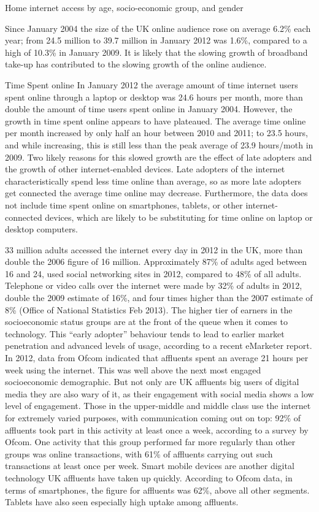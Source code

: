 \documentclass[letterpaper,10pt,openany,oneside,english]{sphinxmanual}
\begin{document}
Home internet access by age, socio-economic group, and gender

Since January 2004 the size of the UK online audience rose on average 6.2\% each year; from
24.5 million to 39.7 million in January 2012 was 1.6\%, compared to a high of 10.3\% in January
2009. It is likely that the slowing growth of broadband take-up has contributed to the slowing
growth of the online audience.

Time Spent online
In January 2012 the average amount of time internet users spent online through a laptop or
desktop was 24.6 hours per month, more than double the amount of time users spent online in
January 2004. However, the growth in time spent online appears to have plateaued. The
average time online per month increased by only half an hour between 2010 and 2011; to 23.5
hours, and while increasing, this is still less than the peak average of 23.9 hours/moth in 2009.
Two likely reasons for this slowed growth are the effect of late adopters and the growth of other
internet-enabled devices. Late adopters of the internet characteristically spend less time online
than average, so as more late adopters get connected the average time online may decrease.
Furthermore, the data does not include time spent online on smartphones, tablets, or other
internet-connected devices, which are likely to be substituting for time online on laptop or
desktop computers.

33 million adults accessed the internet every day in 2012 in the UK, more than double the 2006
figure of 16 million. Approximately 87\% of adults aged between 16 and 24, used social
networking sites in 2012, compared to 48\% of all adults. Telephone or video calls over the
internet were made by 32\% of adults in 2012, double the 2009 estimate of 16\%, and four times
higher than the 2007 estimate of 8\% (Office of National Statistics Feb 2013).
The higher tier of earners in the socioeconomic status groups are at the front of the queue when
it comes to technology. This “early adopter” behaviour tends to lead to earlier market
penetration and advanced levels of usage, according to a recent eMarketer report.
In 2012, data from Ofcom indicated that affluents spent an average 21 hours per week using the
internet. This was well above the next most engaged socioeconomic demographic. But not only
are UK affluents big users of digital media they are also wary of it, as their engagement with
social media shows a low level of engagement.
Those in the upper-middle and middle class use the internet for extremely varied purposes, with
communication coming out on top: 92\% of affluents took part in this activity at least once a
week, according to a survey by Ofcom. One activity that this group performed far more
regularly than other groups was online transactions, with 61\% of affluents carrying out such
transactions at least once per week.
Smart mobile devices are another digital technology UK affluents have taken up quickly.
According to Ofcom data, in terms of smartphones, the figure for affluents was 62\%, above all
other segments. Tablets have also seen especially high uptake among affluents.
\end{document}
